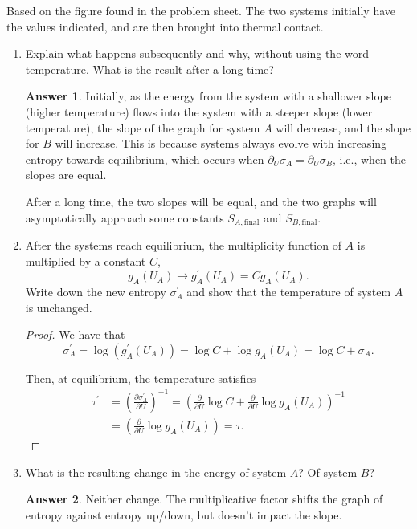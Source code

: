 \documentclass[12pt]{article}
\newenvironment{problem}[2][Problem]{\begin{trivlist}
    \item[\hskip \labelsep {\bfseries #1}\hskip \labelsep {\bfseries #2.}]}{\end{trivlist}}
\theoremstyle{definition}
\newtheorem*{answer}{Answer}
\begin{document}
\begin{problem}{2}
  Based on the figure found in the problem sheet.
  The two systems initially have the values indicated, and are then brought into thermal contact.
  \begin{enumerate}[label=(\alph*)]
    \item Explain what happens subsequently and why, without using the word temperature.
          What is the result after a long time?
          \begin{answer}
            Initially, as the energy from the system with a shallower slope (higher temperature) flows into the system with a steeper slope (lower temperature), the slope of the graph for system \( A \) will decrease, and the slope for \( B \) will increase.
            This is because systems always evolve with increasing entropy towards equilibrium, which occurs when \(\partial_U\sigma_A = \partial_U\sigma_B\), i.e., when the slopes are equal.

            After a long time, the two slopes will be equal, and the two graphs will asymptotically approach some constants \( S_{A, \text{final}} \) and \( S_{B, \text{final}} \).
          \end{answer}
    \item After the systems reach equilibrium, the multiplicity function of \( A \) is multiplied by a constant \( C \),
          \begin{equation}
          \label{eq:6}
          g_A(U_A) \rightarrow g^{\prime}_A(U_A) = C g_A(U_A).
          \end{equation}
          Write down the new entropy \(\sigma^{\prime}_A\) and show that the temperature of system \( A \) is unchanged.
          \begin{proof}
            We have that
            \begin{equation}
            \label{eq:7}
            \sigma^{\prime}_A = \log(g^{\prime}_A(U_A)) = \log C + \log g_A(U_A) = \log C + \sigma_A.
            \end{equation}

            Then, at equilibrium, the temperature satisfies
            \begin{align}
            \label{eq:8}
              \tau^{\prime} &= \left( \frac{\partial \sigma^{\prime}_A}{\partial U}  \right)^{-1} = \left( \frac{\partial }{\partial U} \log C + \frac{\partial }{\partial U} \log g_A(U_A) \right)^{-1} \\
              &= \left( \frac{\partial }{\partial U}  \log g_A(U_A) \right) = \tau.
            \end{align}
          \end{proof}
    \item What is the resulting change in the energy of system \( A \)? Of system \( B \)?
          \begin{answer}
            Neither change.
            The multiplicative factor shifts the graph of entropy against entropy up/down, but doesn't impact the slope.
          \end{answer}
  \end{enumerate}
\end{problem}
\end{document}

